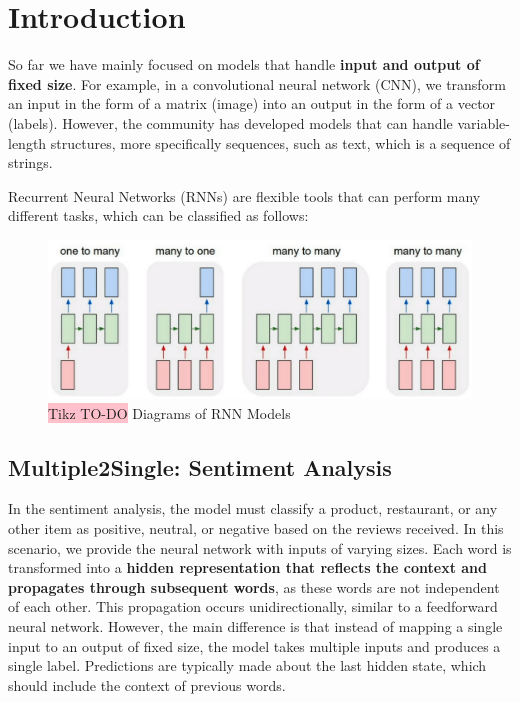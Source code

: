 \section{Introduction}

So far we have mainly focused on models that handle \textbf{input and output of fixed size}. For example, in a convolutional neural network (CNN), we transform an input in the form of a matrix (image) into an output in the form of a vector (labels). However, the community has developed models that can handle variable-length structures, more specifically sequences, such as text, which is a sequence of strings.

Recurrent Neural Networks (RNNs) are flexible tools that can perform many different tasks, which can be classified as follows:

\begin{figure}[!htbp]
    \centering
    \includegraphics[width=\textwidth]{tikz/chapter6 - Types of RNN Models.png}
    \caption{{\color{red}\colorbox{pink}{Tikz TO-DO}} Diagrams of RNN Models}
\end{figure}

\subsection{Multiple2Single: Sentiment Analysis}

In the sentiment analysis, the model must classify a product, restaurant, or any other item as positive, neutral, or negative based on the reviews received. In this scenario, we provide the neural network with inputs of varying sizes. Each word is transformed into a \textbf{hidden representation that reflects the context and propagates through subsequent words}, as these words are not independent of each other. This propagation occurs unidirectionally, similar to a feedforward neural network. However, the main difference is that instead of mapping a single input to an output of fixed size, the model takes multiple inputs and produces a single label. Predictions are typically made about the last hidden state, which should include the context of previous words.

